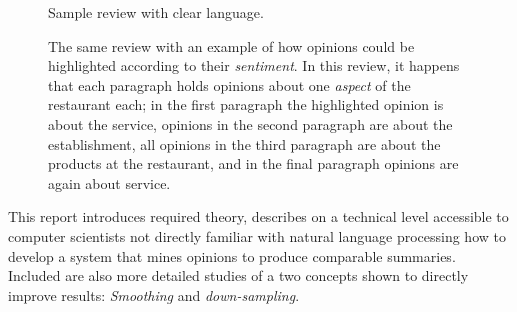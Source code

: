 \documentclass[a4paper,11pt]{kth-mag}
\begin{document}
\begin{figure}[t]
  \centering
  \caption{Sample review with clear language.}
  \label{fig:review_example}

  \caption{The same review with an example of how opinions could be highlighted according to their \emph{sentiment}.
    In this review, it happens that each paragraph holds opinions about one \emph{aspect}
    of the restaurant each; in the first paragraph the highlighted opinion is about the service,
    opinions in the second paragraph are about the establishment, all opinions in the third paragraph are about the products at the restaurant, and in the final paragraph opinions are again about service.
  }
  \label{fig:review_highlight}
\end{figure}

This report introduces required theory, describes on a technical level accessible to computer scientists
not directly familiar with natural language processing how to develop a system that
mines opinions to produce comparable summaries. Included are also more detailed studies of a two concepts
shown to directly improve results: \emph{Smoothing} and \emph{down-sampling}.
\end{document}
